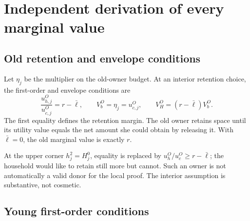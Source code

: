\documentclass[11pt]{article}
\newcommand{\1}{\mathbf 1}
\newcommand{\ellbar}{\bar\ell}
\begin{document}
\section{Independent derivation of every marginal value}
\label{sec:derivation}

\subsection{Old retention and envelope conditions}

Let $\eta_j$ be the multiplier on the old-owner budget. At an interior
retention choice, the first-order and envelope conditions are
\begin{equation}
\frac{u_{h,j}^O}{u_{c,j}^O}=r-\ellbar,
\qquad
V_b^O=\eta_j=u_{c,j}^O,
\qquad
V_H^O=(r-\ellbar)V_b^O.
\label{eq:old_envelopes}
\end{equation}
The first equality defines the retention margin. The old owner retains space
until its utility value equals the net amount she could obtain by releasing
it. With $\ellbar=0$, the old marginal value is exactly $r$.

At the upper corner $h_j^2=H_j^0$, equality is replaced by
$u_h^O/u_c^O\ge r-\ellbar$; the household would like to retain still more but
cannot. Such an owner is not automatically a valid donor for the local proof.
The interior assumption is substantive, not cosmetic.

\subsection{Young first-order conditions}
\end{document}
